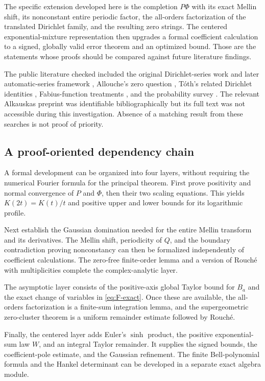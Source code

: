 \documentclass[11pt,a4paper]{article}
\numberwithin{equation}{section}
\theoremstyle{definition}
\theoremstyle{remark}
\begin{document}
The specific extension developed here is the completion $P\Phi$
with its exact Mellin shift, its nonconstant entire periodic factor,
the all-orders factorization of the translated Dirichlet family,
and the resulting zero strings. The centered exponential-mixture
representation then upgrades a formal coefficient calculation to
a signed, globally valid error theorem and an optimized bound.
Those are the statements whose proofs should be compared against
future literature findings.

The public literature checked included the original Dirichlet-series
work and later automatic-series framework \cite{AC,AMP}, Allouche's
zero question \cite{AlloucheQuestions}, T\'oth's related Dirichlet
identities \cite{Toth}, Fabius-function treatments
\cite{Arias,Haugland}, and the probability survey \cite{AGK}.
The relevant Alkauskas preprint was identifiable bibliographically
but its full text was not accessible during this investigation.
Absence of a matching result from these searches is not proof of
priority.

\subsection{A proof-oriented dependency chain}
A formal development can be organized into four layers, without
requiring the numerical Fourier formula for the principal theorem.
First prove positivity and normal convergence of $P$ and $\Phi$,
then their two scaling equations. This yields $K(2t)=K(t)/t$ and
positive upper and lower bounds for its logarithmic profile.

Next establish the Gaussian domination needed for the entire Mellin
transform and its derivatives. The Mellin shift, periodicity of $Q$,
and the boundary contradiction proving nonconstancy can then be
formalized independently of coefficient calculations. The zero-free
finite-order lemma and a version of Rouch\'e with multiplicities
complete the complex-analytic layer.

The asymptotic layer consists of the positive-axis global Taylor
bound for $B_a$ and the exact change of variables in
\cref{eq:F-exact}. Once these are available, the all-orders
factorization is a finite-sum integration lemma, and the
supergeometric zero-cluster theorem is a uniform remainder estimate
followed by Rouch\'e.

Finally, the centered layer adds Euler's $\sinh$ product, the
positive exponential-sum law $W$, and an integral Taylor remainder.
It supplies the signed bounds, the coefficient-pole estimate, and
the Gaussian refinement. The finite Bell-polynomial formula and the
Hankel determinant can be developed in a separate exact algebra
module.
\end{document}
